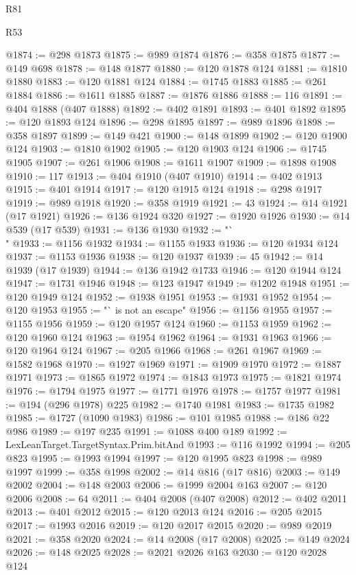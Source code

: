 \begin{lexlean}{R81}
\begin{lexlean}{R53}
\begin{coremodule}
{{{{{{{{{{{{{{{{{{{{{{{{{{{{{{{{{{{{{{{{{{{{{{{{{{{{{{{{{{{{{{{{{{{{{{{{{{{{{{{{{{{{{{{{{{{{{{{{{{{{{{{{{{{{{{{{@1874 := @298 @1873
@1875 := @989 @1874
@1876 := @358 @1875
@1877 := @149 @698
@1878 := @148 @1877
@1880 := @120 @1878 @124
@1881 := @1810 @1880
@1883 := @120 @1881 @124
@1884 := @1745 @1883
@1885 := @261 @1884
@1886 := @1611 @1885
@1887 := @1876 @1886
@1888 := 116
@1891 := @404 @1888 (@407 @1888)
@1892 := @402 @1891
@1893 := @401 @1892
@1895 := @120 @1893 @124
@1896 := @298 @1895
@1897 := @989 @1896
@1898 := @358 @1897
@1899 := @149 @421
@1900 := @148 @1899
@1902 := @120 @1900 @124
@1903 := @1810 @1902
@1905 := @120 @1903 @124
@1906 := @1745 @1905
@1907 := @261 @1906
@1908 := @1611 @1907
@1909 := @1898 @1908
@1910 := 117
@1913 := @404 @1910 (@407 @1910)
@1914 := @402 @1913
@1915 := @401 @1914
@1917 := @120 @1915 @124
@1918 := @298 @1917
@1919 := @989 @1918
@1920 := @358 @1919
@1921 := 43
@1924 := @14 @1921 (@17 @1921)
@1926 := @136 @1924 @320
@1927 := @1920 @1926
@1930 := @14 @539 (@17 @539)
@1931 := @136 @1930
@1932 := "`\\"
@1933 := @1156 @1932
@1934 := @1155 @1933
@1936 := @120 @1934 @124
@1937 := @1153 @1936
@1938 := @120 @1937
@1939 := 45
@1942 := @14 @1939 (@17 @1939)
@1944 := @136 @1942 @1733
@1946 := @120 @1944 @124
@1947 := @1731 @1946
@1948 := @123 @1947
@1949 := @1202 @1948
@1951 := @120 @1949 @124
@1952 := @1938 @1951
@1953 := @1931 @1952
@1954 := @120 @1953
@1955 := "` is not an escape"
@1956 := @1156 @1955
@1957 := @1155 @1956
@1959 := @120 @1957 @124
@1960 := @1153 @1959
@1962 := @120 @1960 @124
@1963 := @1954 @1962
@1964 := @1931 @1963
@1966 := @120 @1964 @124
@1967 := @205 @1966
@1968 := @261 @1967
@1969 := @1582 @1968
@1970 := @1927 @1969
@1971 := @1909 @1970
@1972 := @1887 @1971
@1973 := @1865 @1972
@1974 := @1843 @1973
@1975 := @1821 @1974
@1976 := @1794 @1975
@1977 := @1771 @1976
@1978 := @1757 @1977
@1981 := @194 (@296 @1978) @225
@1982 := @1740 @1981
@1983 := @1735 @1982
@1985 := @1727 (@1090 @1983)
@1986 := @101 @1985
@1988 := @186 @22 @986
@1989 := @197 @235
@1991 := @1088 @400 @189
@1992 := LexLeanTarget.TargetSyntax.Prim.bitAnd
@1993 := @116 @1992
@1994 := @205 @823
@1995 := @1993 @1994
@1997 := @120 @1995 @823
@1998 := @989 @1997
@1999 := @358 @1998
@2002 := @14 @816 (@17 @816)
@2003 := @149 @2002
@2004 := @148 @2003
@2006 := @1999 @2004 @163
@2007 := @120 @2006
@2008 := 64
@2011 := @404 @2008 (@407 @2008)
@2012 := @402 @2011
@2013 := @401 @2012
@2015 := @120 @2013 @124
@2016 := @205 @2015
@2017 := @1993 @2016
@2019 := @120 @2017 @2015
@2020 := @989 @2019
@2021 := @358 @2020
@2024 := @14 @2008 (@17 @2008)
@2025 := @149 @2024
@2026 := @148 @2025
@2028 := @2021 @2026 @163
@2030 := @120 @2028 @124
}}}}}}}}}}}}}}}}}}}}}}}}}}}}}}}}}}}}}}}}}}}}}}}}}}}}}}}}}}}}}}}}}}}}}}}}}}}}}}}}}}}}}}}}}}}}}}}}}}}}}}}}}}}}}}}}
\end{coremodule}
\end{lexlean}
\end{lexlean}
